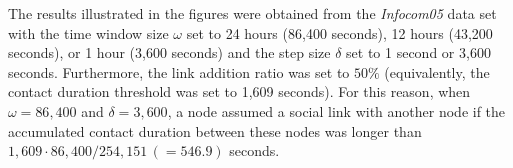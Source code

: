 The results illustrated in the figures were obtained from the {\em Infocom05} data set with the time window size $\omega$ set to 24 hours (86,400 seconds), 12 hours (43,200 seconds), or 1 hour (3,600 seconds) and the step size $\delta$ set to 1 second or 3,600 seconds.
Furthermore, the link addition ratio was set to $50\%$ (equivalently, the contact duration threshold was set to 1,609 seconds).
For this reason, when $\omega=86{,}400$ and $\delta=3{,}600$, a node assumed a social link with another node if the accumulated contact duration between these nodes was longer than $1{,}609 \cdot 86{,}400 / 254{,}151\, (=546.9)$ seconds. 

